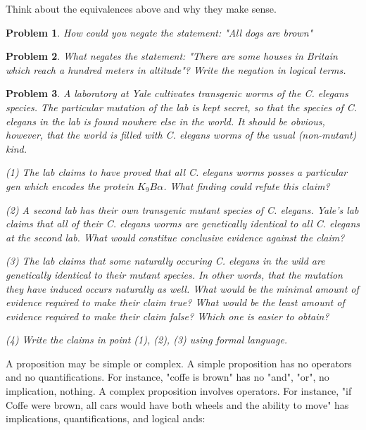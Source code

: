 \documentclass[a4paper, 12pt]{article}
\newtheorem{problem}{Problem}
\newtheorem{problem}{Problem}
\begin{document}
Think about the equivalences above and why they make sense. 

\begin{problem}
    How could you negate the statement: "All dogs are brown"
\end{problem}

\begin{problem}
    What negates the statement: "There are some houses in Britain which reach a
    hundred meters in altitude"? Write the negation in logical terms.
\end{problem}

\begin{problem}
    A laboratory at Yale cultivates transgenic worms of the \textit{C. elegans} species. The particular 
    mutation of the lab is kept secret, so that the species of \textit{C. elegans} in the lab 
    is found nowhere else in the world. It should be obvious, however, that the world 
    is filled with \textit{C. elegans} worms of the usual (non-mutant) kind. 

    (1) The lab claims to have proved that all \textit{C. elegans} worms 
    posses a particular gen which encodes the protein $K_9B\alpha$. What 
    finding could refute this claim?

    (2) A second lab has their own transgenic mutant species of \textit{C.
    elegans}. Yale's lab claims that all of their \textit{C. elegans} worms are
    genetically identical to all \textit{C. elegans} at the second lab.
    What would constitue conclusive evidence against the claim?

    (3) The lab claims that some naturally occuring \textit{C. elegans} in the
    wild are genetically identical to their mutant species. In other words,
    that the mutation they have induced occurs naturally as well. What would be
    the minimal amount of evidence required to make their claim true? What would 
    be the least amount of evidence required to make their claim false? Which one 
    is easier to obtain?

    (4) Write the claims in point (1), (2), (3) using formal language.
\end{problem}

A proposition may be simple or complex. A simple proposition has no operators
and no quantifications. For instance, "coffe is brown" has no "and", "or", no
implication, nothing. A complex proposition involves operators. For instance,
"if Coffe were brown, all cars would have both wheels and the ability to move"
has implications, quantifications, and logical ands: 
\end{document}
